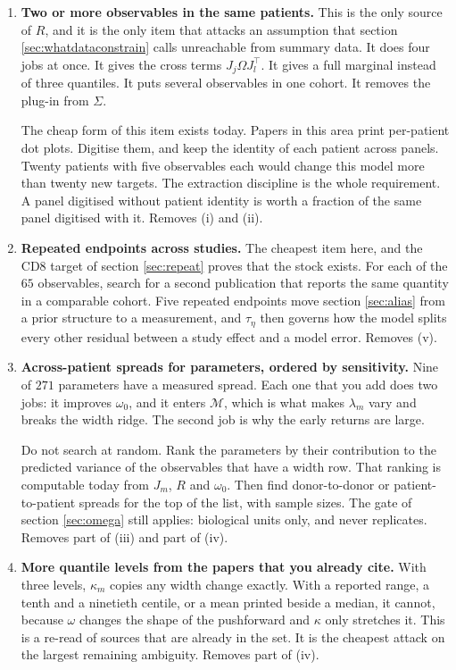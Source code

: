 \documentclass[11pt]{article}
\newcommand{\Mset}{\mathcal{M}}
\newcommand{\Tr}{^{\!\top}}
\begin{document}
\begin{enumerate}
\item \textbf{Two or more observables in the same patients.} This is the only
source of $R$, and it is the only item that attacks an assumption that section
\ref{sec:whatdataconstrain} calls unreachable from summary data. It does four
jobs at once. It gives the cross terms $J_j\Omega J_l\Tr$. It gives a full
marginal instead of three quantiles. It puts several observables in one cohort.
It removes the plug-in from $\Sigma$.

The cheap form of this item exists today. Papers in this area print per-patient
dot plots. Digitise them, and keep the identity of each patient across panels.
Twenty patients with five observables each would change this model more than
twenty new targets. The extraction discipline is the whole requirement. A panel
digitised without patient identity is worth a fraction of the same panel
digitised with it. Removes (i) and (ii).

\item \textbf{Repeated endpoints across studies.} The cheapest item here, and
the CD8 target of section \ref{sec:repeat} proves that the stock exists. For each
of the $65$ observables, search for a second publication that reports the same
quantity in a comparable cohort. Five repeated endpoints move section
\ref{sec:alias} from a prior structure to a measurement, and $\tau_\eta$ then
governs how the model splits every other residual between a study effect and a
model error. Removes (v).

\item \textbf{Across-patient spreads for parameters, ordered by sensitivity.}
Nine of $271$ parameters have a measured spread. Each one that you add does two
jobs: it improves $\omega_0$, and it enters $\Mset$, which is what makes
$\lambda_m$ vary and breaks the width ridge. The second job is why the early
returns are large.

Do not search at random. Rank the parameters by their contribution to the
predicted variance of the observables that have a width row. That ranking is
computable today from $J_m$, $R$ and $\omega_0$. Then find donor-to-donor or
patient-to-patient spreads for the top of the list, with sample sizes. The gate
of section \ref{sec:omega} still applies: biological units only, and never
replicates. Removes part of (iii) and part of (iv).

\item \textbf{More quantile levels from the papers that you already cite.} With
three levels, $\kappa_m$ copies any width change exactly. With a reported range,
a tenth and a ninetieth centile, or a mean printed beside a median, it cannot,
because $\omega$ changes the shape of the pushforward and $\kappa$ only stretches
it. This is a re-read of sources that are already in the set. It is the cheapest
attack on the largest remaining ambiguity. Removes part of (iv).


\end{enumerate}
\end{document}
